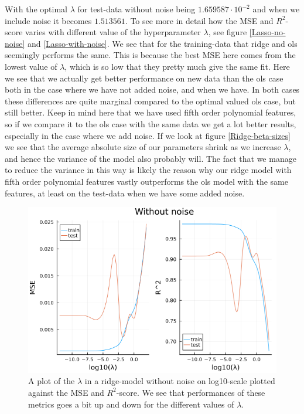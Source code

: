 \documentclass{article}
\begin{document}
With the optimal $\lambda$ for test-data without noise being $1.659587\cdot
    10^{-2}$ and when we include noise it becomes $1.513561$.
To see more in detail how the MSE and $R^2$-score varies with different value of
the hyperparameter $\lambda$, see figure \ref{Lasso-no-noise} and
\ref{Lasso-with-noise}. We see that for the training-data that ridge and ols
seemingly performs the same.  This is because the best MSE here comes from the
lowest value of $\lambda$, which is so low that they pretty much give the same
fit. Here we see that we actually get better performance on new data than the
ols case both in the case where we have not added noise, and when we have. In
both cases these differences are quite marginal compared to the optimal valued
ols case, but still better. Keep in mind here that we have used fifth order
polynomial features, so if we compare it to the ols case with the same data we
get a lot better results, especially in the case where we add noise. If we look
at figure \ref{Ridge-beta-sizes} we see that the average absolute size of our
parameters shrink as we increase $\lambda$, and hence the variance of the model
also probably will.  The fact that we manage to reduce the variance in this way
is likely the reason why our ridge model with fifth order polynomial features
vastly outperforms the ols model with the same features, at least on the
test-data when we have some added noise.
\begin{figure}
    \centerline{\includegraphics[scale=0.5]{ridge_without_noise}}
    \caption{A plot of the $\lambda$ in a ridge-model without noise on log10-scale plotted against the MSE and $R^2$-score. We see that performances of these metrics goes a bit up and down for the different values of $\lambda$.}
    \label{Ridge-with-noise}
\end{figure}
\end{document}
